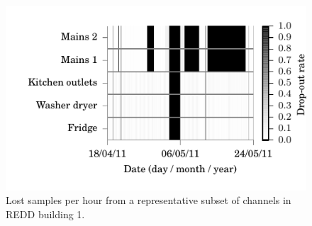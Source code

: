 \documentclass{sig-alternate}
\begin{document}
\begin{figure}[!t]
  \centering
  \includegraphics[width=\columnwidth]{figures/lost_samples.pdf} 
  \caption{Lost samples per hour from a representative subset of channels in REDD building 1.}
  \label{fig:lost_samples} 
\end{figure}
\end{document}
